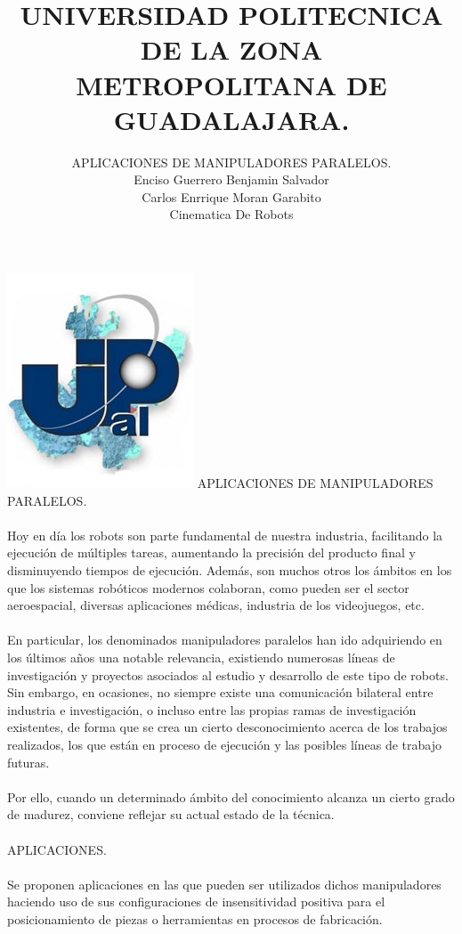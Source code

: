 \documentclass[12pt,a4paper]{article}
\author{APLICACIONES DE MANIPULADORES PARALELOS.\\Enciso Guerrero Benjamin Salvador\\
Carlos Enrrique Moran Garabito\\
Cinematica De Robots }
\title{UNIVERSIDAD POLITECNICA DE LA ZONA METROPOLITANA DE GUADALAJARA.}
\begin{document}
\maketitle
\includegraphics[scale=1.8]{upzmgg.jpg} 
\newpage
APLICACIONES DE MANIPULADORES PARALELOS.
\\\\
Hoy en día los robots son parte fundamental de nuestra industria, facilitando la ejecución de múltiples tareas, aumentando la precisión del producto final y disminuyendo tiempos de ejecución. Además, son muchos otros los ámbitos en los que los sistemas robóticos modernos colaboran, como pueden ser el sector aeroespacial, diversas aplicaciones médicas, industria de los videojuegos, etc. 
\\\\
En particular, los denominados manipuladores paralelos han ido adquiriendo en los últimos años una notable relevancia, existiendo numerosas líneas de investigación y proyectos asociados al estudio y desarrollo de este tipo de robots. Sin embargo, en ocasiones, no siempre existe una comunicación bilateral entre industria e investigación, o incluso entre las propias ramas de investigación existentes, de forma que se crea un cierto desconocimiento acerca de los trabajos realizados, los que están en proceso de ejecución y las posibles líneas de trabajo futuras. 
\\\\
Por ello, cuando un determinado ámbito del conocimiento alcanza un cierto grado de madurez, conviene reflejar su actual estado de la técnica. 
\\\\
APLICACIONES.
\\\\
Se proponen aplicaciones en las que pueden ser utilizados dichos manipuladores haciendo uso de sus configuraciones de insensitividad positiva para el posicionamiento de piezas o herramientas en procesos de fabricación.
\end{document}
